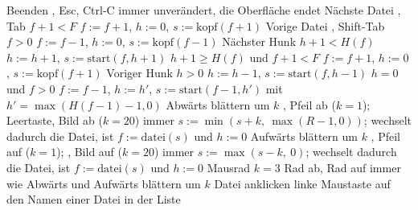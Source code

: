 \startplacetable[title={Übergänge des Zustands $(f, h, s, m, w, c, t)$},
  reference=tab:tui-transitions,location=here]
\startxtable[frame=off,option=stretch]
\startxrow[topframe=on,bottomframe=on]
 \stopxcell
{} \stopxcell
{} \stopxcell
{} \stopxcell
\stopxrow
\startxrow
\startxcell Beenden \stopxcell
\startxcell {}, Esc, Ctrl-C \stopxcell
\startxcell immer \stopxcell
\startxcell unverändert, die Oberfläche endet \stopxcell
\stopxrow
\startxrow
\startxcell Nächste Datei \stopxcell
\startxcell {}, Tab \stopxcell
\startxcell $f + 1 < F$ \stopxcell
\startxcell $f := f+1$, $h := 0$, $s := \mathrm{kopf}(f+1)$ \stopxcell
\stopxrow
\startxrow
\startxcell Vorige Datei \stopxcell
\startxcell {}, Shift-Tab \stopxcell
\startxcell $f > 0$ \stopxcell
\startxcell $f := f-1$, $h := 0$, $s := \mathrm{kopf}(f-1)$ \stopxcell
\stopxrow
\startxrow
\startxcell Nächster Hunk \stopxcell
\startxcell {} \stopxcell
\startxcell $h + 1 < H(f)$ \stopxcell
\startxcell $h := h+1$, $s := \mathrm{start}(f, h+1)$ \stopxcell
\stopxrow
\startxrow
\startxcell \stopxcell
\startxcell \stopxcell
\startxcell $h + 1 \ge H(f)$ und $f + 1 < F$ \stopxcell
\startxcell $f := f+1$, $h := 0$, $s := \mathrm{kopf}(f+1)$ \stopxcell
\stopxrow
\startxrow
\startxcell Voriger Hunk \stopxcell
\startxcell {} \stopxcell
\startxcell $h > 0$ \stopxcell
\startxcell $h := h-1$, $s := \mathrm{start}(f, h-1)$ \stopxcell
\stopxrow
\startxrow
\startxcell \stopxcell
\startxcell \stopxcell
\startxcell $h = 0$ und $f > 0$ \stopxcell
\startxcell $f := f-1$, $h := h'$, $s := \mathrm{start}(f-1, h')$
mit $h' = \max(H(f-1) - 1, 0)$ \stopxcell
\stopxrow
\startxrow
\startxcell Abwärts blättern um $k$ \stopxcell
\startxcell {}, Pfeil ab ($k = 1$); Leertaste, Bild ab ($k = 20$) \stopxcell
\startxcell immer \stopxcell
\startxcell $s := \min(s + k,\ \max(R - 1, 0))$; wechselt dadurch die Datei, ist
$f := \mathrm{datei}(s)$ und $h := 0$ \stopxcell
\stopxrow
\startxrow
\startxcell Aufwärts blättern um $k$ \stopxcell
\startxcell {}, Pfeil auf ($k = 1$); , Bild auf ($k = 20$) \stopxcell
\startxcell immer \stopxcell
\startxcell $s := \max(s - k,\ 0)$; wechselt dadurch die Datei, ist
$f := \mathrm{datei}(s)$ und $h := 0$ \stopxcell
\stopxrow
\startxrow
\startxcell Mausrad $k = 3$ \stopxcell
\startxcell Rad ab, Rad auf \stopxcell
\startxcell immer \stopxcell
\startxcell wie Abwärts und Aufwärts blättern um $k$ \stopxcell
\stopxrow
\startxrow
\startxcell Datei anklicken \stopxcell
\startxcell linke Maustaste auf den Namen einer Datei in der Liste \stopxcell
